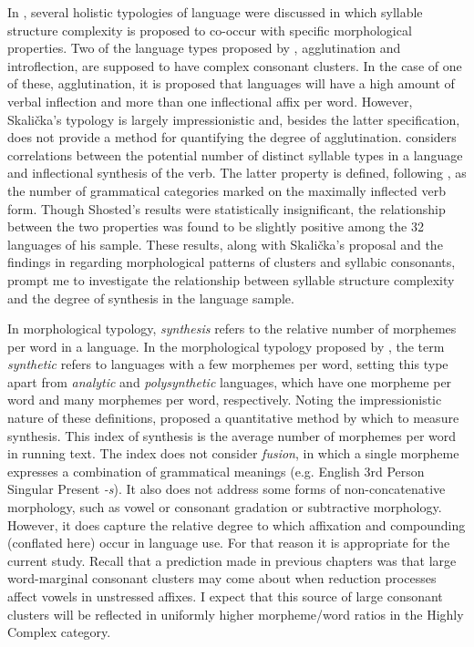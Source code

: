   In , several holistic typologies of language were discussed in which syllable structure complexity is proposed to co-occur with specific morphological properties. Two of the language types proposed by \citet{Skalička1979}, agglutination and introflection, are supposed to have complex consonant clusters. In the case of one of these, agglutination, it is proposed that languages will have a high amount of verbal inflection and more than one inflectional affix per word. However, Skalička’s typology is largely impressionistic and, besides the latter specification, does not provide a method for quantifying the degree of agglutination. \citet{Shosted2006} considers correlations between the potential number of distinct syllable types in a language and inflectional synthesis of the verb. The latter property is defined, following \citet{BickelNichols2005}, as the number of grammatical categories marked on the maximally inflected verb form. Though Shosted’s results were statistically insignificant, the relationship between the two properties was found to be slightly positive among the 32 languages of his sample. These results, along with Skalička’s proposal and the findings in  regarding morphological patterns of clusters and syllabic consonants, prompt me to investigate the relationship between syllable structure complexity and the degree of synthesis in the language sample.

  In morphological typology, \textit{synthesis} refers to the relative number of morphemes per word in a language. In the morphological typology proposed by \citet{Sapir1921}, the term \textit{synthetic} refers to languages with a few morphemes per word, setting this type apart from \textit{analytic} and \textit{polysynthetic} languages, which have one morpheme per word and many morphemes per word, respectively. Noting the impressionistic nature of these definitions, \citet{Greenberg1954} proposed a quantitative method by which to measure synthesis. This index of synthesis is the average number of morphemes per word in running text. The index does not consider \textit{fusion}, in which a single morpheme expresses a combination of grammatical meanings (e.g. English 3rd Person Singular Present \textit{-s}). It also does not address some forms of non-concatenative morphology, such as vowel or consonant gradation or subtractive morphology. However, it does capture the relative degree to which affixation and compounding (conflated here) occur in language use. For that reason it is appropriate for the current study. Recall that a prediction made in previous chapters was that large word-marginal consonant clusters may come about when reduction processes affect vowels in unstressed affixes. I expect that this source of large consonant clusters will be reflected in uniformly higher morpheme/word ratios in the Highly Complex category.


